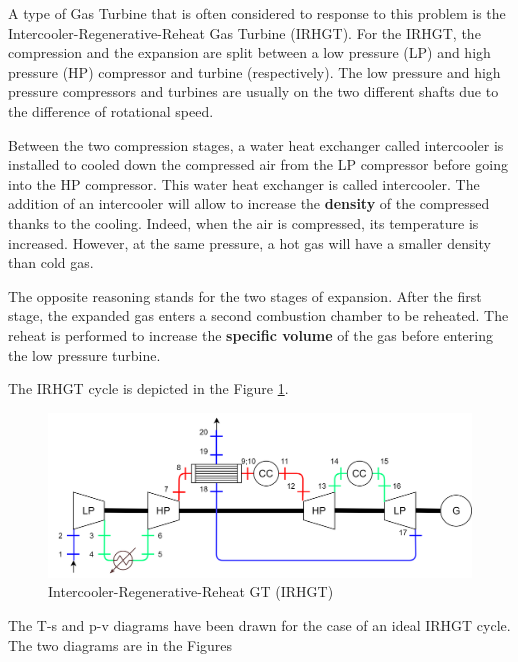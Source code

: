 A type of Gas Turbine that is often considered to response to this problem is the Intercooler-Regenerative-Reheat Gas Turbine (IRHGT). For the IRHGT, the compression and the expansion are split between a low pressure (LP) and high pressure (HP) compressor and turbine (respectively). The low pressure and high pressure compressors and turbines are usually on the two different shafts due to the difference of rotational speed.  

Between the two compression stages, a water heat exchanger called intercooler is installed to cooled down the compressed air from the LP compressor before going into the HP compressor. This water heat exchanger is called intercooler. The addition of an intercooler will allow to increase the \textbf{density} of the compressed thanks to the cooling. Indeed, when the air is compressed, its temperature is increased. However, at the same pressure, a hot gas will have a smaller density than cold gas. 

The opposite reasoning stands for the two stages of expansion. After the first stage, the expanded gas enters a second combustion chamber to be reheated. The reheat is performed to increase the \textbf{specific volume} of the gas before entering the low pressure turbine. 

The IRHGT cycle is depicted in the Figure \ref{fig:C5_IRHGT}.

\begin{figure}[h]
\centering
\includegraphics[width=1\textwidth]{IRHGT}
\caption{Intercooler-Regenerative-Reheat GT (IRHGT)}
\label{fig:C5_IRHGT}
\end{figure}

The T-s and p-v diagrams have been drawn for the case of an ideal IRHGT cycle. The two diagrams are in the Figures 

